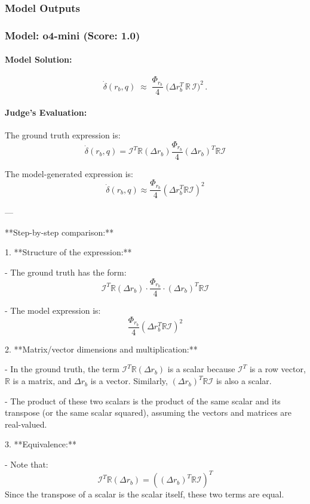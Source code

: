 \documentclass[10pt]{article}
\begin{document}
\subsubsection*{Model Outputs}
\subsubsection*{Model: o4-mini (Score: 1.0)}
\paragraph*{Model Solution:}
\[ \dot{\delta}(r_b,q)\;\approx\;\frac{\Phi_{r_b}}4\;\bigl(\Delta r_b^T\,\mathbb R\,\mathcal I\bigr)^2\,. \]

\paragraph*{Judge's Evaluation:}

The ground truth expression is:
\[
\dot{\delta}(r_b, q) = \mathcal{I}^T \mathbb{R} (\Delta r_b) \frac{\Phi_{r_b}}{4} (\Delta r_b)^T \mathbb{R} \mathcal{I}
\]

The model-generated expression is:
\[
\dot{\delta}(r_b,q) \approx \frac{\Phi_{r_b}}{4} \left(\Delta r_b^T \mathbb{R} \mathcal{I}\right)^2
\]

---

**Step-by-step comparison:**

1. **Structure of the expression:**

- The ground truth has the form:
\[
\mathcal{I}^T \mathbb{R} (\Delta r_b) \cdot \frac{\Phi_{r_b}}{4} \cdot (\Delta r_b)^T \mathbb{R} \mathcal{I}
\]

- The model expression is:
\[
\frac{\Phi_{r_b}}{4} \left(\Delta r_b^T \mathbb{R} \mathcal{I}\right)^2
\]

2. **Matrix/vector dimensions and multiplication:**

- In the ground truth, the term \(\mathcal{I}^T \mathbb{R} (\Delta r_b)\) is a scalar because \(\mathcal{I}^T\) is a row vector, \(\mathbb{R}\) is a matrix, and \(\Delta r_b\) is a vector. Similarly, \((\Delta r_b)^T \mathbb{R} \mathcal{I}\) is also a scalar.

- The product of these two scalars is the product of the same scalar and its transpose (or the same scalar squared), assuming the vectors and matrices are real-valued.

3. **Equivalence:**

- Note that:
\[
\mathcal{I}^T \mathbb{R} (\Delta r_b) = \left( (\Delta r_b)^T \mathbb{R} \mathcal{I} \right)^T
\]
Since the transpose of a scalar is the scalar itself, these two terms are equal.
\end{document}
